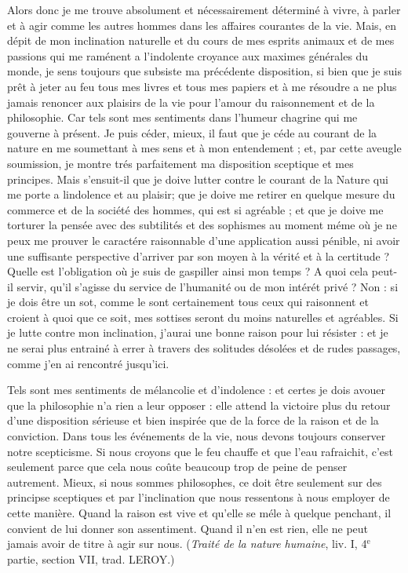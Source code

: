 Alors donc je me trouve absolument et nécessairement
déterminé à vivre, à parler et à agir comme les autres
hommes dans les affaires courantes de la vie. Mais, en
dépit de mon inclination naturelle et du cours de mes
esprits animaux et de mes passions qui me raménent a
l'indolente croyance aux maximes générales du monde,
je sens toujours que subsiste ma précédente disposition,
si bien que je suis prêt à jeter au feu tous mes livres et
tous mes papiers et à me résoudre a ne plus jamais renoncer
aux plaisirs de la vie pour l’amour du raisonnement et de
la philosophie. Car tels sont mes sentiments dans l’humeur
chagrine qui me gouverne à présent. Je puis céder, mieux,
il faut que je céde au courant de la nature en me soumettant
à mes sens et à mon entendement ; et, par cette
aveugle soumission, je montre trés parfaitement ma
disposition sceptique et mes principes. Mais s’ensuit-il
que je doive lutter contre le courant de la Nature qui me
porte a lindolence et au plaisir; que je doive me retirer
en quelque mesure du commerce et de la société des
hommes, qui est si agréable ; et que je doive me torturer
la pensée avec des subtilités et des sophismes au moment
méme où je ne peux me prouver le caractére raisonnable
d'une application aussi pénible, ni avoir une suffisante
perspective d’arriver par son moyen à la vérité et à la
certitude ? Quelle est l'obligation où je suis de gaspiller
ainsi mon temps ? A quoi cela peut-il servir, qu'il s’agisse
du service de l’humanité ou de mon intérét privé ? Non :
si je dois être un sot, comme le sont certainement tous ceux
qui raisonnent et croient à quoi que ce soit, mes sottises
seront du moins naturelles et agréables. Si je lutte contre
mon inclination, j’aurai une bonne raison pour lui résister :
et je ne serai plus entrainé à errer à travers des solitudes
désolées et de rudes passages, comme j’en ai rencontré
jusqu’ici.

Tels sont mes sentiments de mélancolie et d’indolence :
et certes je dois avouer que la philosophie n’a rien a leur
opposer : elle attend la victoire plus du retour d’une disposition
sérieuse et bien inspirée que de la force de la
raison et de la conviction. Dans tous les événements de la
vie, nous devons toujours conserver notre scepticisme.
Si nous croyons que le feu chauffe et que l’eau rafraichit,
c’est seulement parce que cela nous coûte beaucoup trop
de peine de penser autrement. Mieux, si nous sommes
philosophes, ce doit être seulement sur des principse
sceptiques et par l’inclination que nous ressentons à nous
employer de cette manière. Quand la raison est vive et
qu’elle se méle à quelque penchant, il convient de lui
donner son assentiment. Quand il n’en est rien, elle
ne peut jamais avoir de titre à agir sur nous. ({\it Traité
de la nature humaine}, liv. I, 4$^\text{e}$ partie, section VII,
trad. L{\footnotesize EROY}.)

